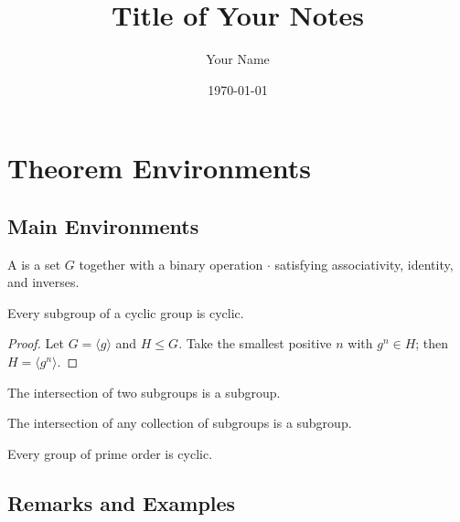 \documentclass[11pt,oneside]{scrbook}
\title{Title of Your Notes}
\author{Your Name}
\date{\today}
\begin{document}
\maketitle
\tableofcontents

\chapter{Theorem Environments}

\section{Main Environments}


\begin{definition}
    A  is a set $G$ together with a binary operation $\cdot$
    satisfying associativity, identity, and inverses.
\end{definition}

\begin{theorem}
    Every subgroup of a cyclic group is cyclic.
\end{theorem}
\begin{proof}
    Let $G = \langle g \rangle$ and $H \le G$. Take the smallest positive
    $n$ with $g^n \in H$; then $H = \langle g^n \rangle$.
\end{proof}

\begin{lemma}
    The intersection of two subgroups is a subgroup.
\end{lemma}

\begin{corollary}
    The intersection of any collection of subgroups is a subgroup.
\end{corollary}

\begin{proposition}
    Every group of prime order is cyclic.
\end{proposition}

\section{Remarks and Examples}
\end{document}
